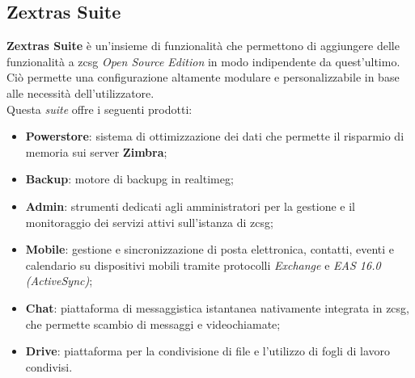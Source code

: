     \subsection{Zextras Suite}
        \textbf{Zextras Suite} è un'insieme di funzionalità che permettono di aggiungere delle funzionalità a \gls{zcsg} \textit{Open Source Edition} in modo indipendente da quest'ultimo. Ciò permette una configurazione altamente modulare e personalizzabile in base alle necessità dell'utilizzatore. \\
        Questa \textit{suite} offre i seguenti prodotti:
        \begin{itemize}
            \setlength\itemsep{0em}
            \item \textbf{Powerstore}: sistema di ottimizzazione dei dati che permette il risparmio di memoria sui server \textbf{Zimbra};
            \item \textbf{Backup}: motore di \gls{backupg} in \gls{realtimeg};
            \item \textbf{Admin}: strumenti dedicati agli amministratori per la gestione e il monitoraggio dei servizi attivi sull'istanza di \gls{zcsg};
            \item \textbf{Mobile}: gestione e sincronizzazione di posta elettronica, contatti, eventi e calendario su dispositivi mobili tramite protocolli \textit{Exchange} e \textit{EAS 16.0 (ActiveSync)};
            \item \textbf{Chat}: piattaforma di messaggistica istantanea nativamente integrata in \gls{zcsg}, che permette scambio di messaggi e videochiamate;
            \item \textbf{Drive}: piattaforma per la condivisione di file e l'utilizzo di fogli di lavoro condivisi.
        \end{itemize}

